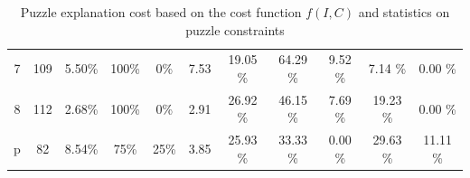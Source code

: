 \begin{table}[t]
\begin{tabular}{c|cc|cc|c|ccccc}
		7          & 109                & 5.50\%             & 100\%                                              & 0\%                   & 7.53                                                                   & 19.05 \%      & 64.29 \%        & 9.52 \%       & 7.14 \%            & 0.00 \%      \\
		8          & 112                & 2.68\%             & 100\%                                              & 0\%                   & 2.91                                                                   & 26.92 \%      & 46.15 \%        & 7.69 \%       & 19.23 \%           & 0.00 \%      \\
		p          & 82                 & 8.54\%             & 75\%                                               & 25\%                  & 3.85                                                                   & 25.93 \%      & 33.33 \%        & 0.00 \%       & 29.63 \%           & 11.11 \%
	\end{tabular}
	\caption{Puzzle explanation cost based on the cost function $f(I, C)$ and statistics on puzzle constraints}

	\label{table:nested_explanation}

\end{table}



